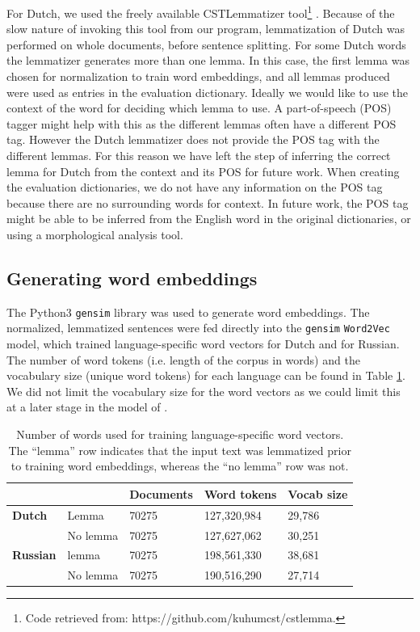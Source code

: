 \documentclass{article}
\begin{document}
For Dutch, we used the freely available CSTLemmatizer tool\footnote{Code retrieved from: https://github.com/kuhumcst/cstlemma.} \citep{jongejan2009automatic}. Because of the slow nature of invoking this tool from our program, lemmatization of Dutch was performed on whole documents, before sentence splitting. For some Dutch words the lemmatizer generates more than one lemma. In this case, the first lemma was chosen for normalization to train word embeddings, and all lemmas produced were used as entries in the evaluation dictionary. Ideally we would like to use the context of the word for deciding which lemma to use. A part-of-speech (POS) tagger might help with this as the different lemmas often have a different POS tag. However the Dutch lemmatizer does not provide the POS tag with the different lemmas. For this reason we have left the step of inferring the correct lemma for Dutch from the context and its POS for future work. When creating the evaluation dictionaries, we do not have any information on the POS tag because there are no surrounding words for context. In future work, the POS tag might be able to be inferred from the English word in the original dictionaries, or using a morphological analysis tool. 

\subsection{Generating word embeddings}

The Python3 \texttt{gensim} \citep{rehureklrec} library was used to generate word embeddings. The normalized, lemmatized sentences were fed directly into the \texttt{gensim} \texttt{Word2Vec} model, which trained language-specific word vectors for Dutch and for Russian. The number of word tokens (i.e. length of the corpus in words) and the vocabulary size (unique word tokens) for each language can be found in Table \ref{table:word-count}. We did not limit the vocabulary size for the word vectors as we could limit this at a later stage in the model of \cite{conneau2017word}. 

\begin{table}[ht]
\centering
\begin{tabular}{|l|l|l|l|l|}
\hline
        & & \textbf{Documents}     & \textbf{Word tokens} & \textbf{Vocab size} \\ \hline
\textbf{Dutch}       & Lemma & 70275   & 127,320,984      & 29,786      \\ \hline
        & No lemma   & 70275           & 127,627,062      & 30,251      \\ \hline
\textbf{Russian}     & lemma & 70275   & 198,561,330      & 38,681      \\ \hline
        & No lemma   & 70275           & 190,516,290      & 27,714      \\ \hline
\end{tabular}
\caption{Number of words used for training language-specific word vectors. The ``lemma'' row indicates that the input text was lemmatized prior to training word embeddings, whereas the ``no lemma'' row was not.}
\label{table:word-count}
\end{table}
\end{document}

